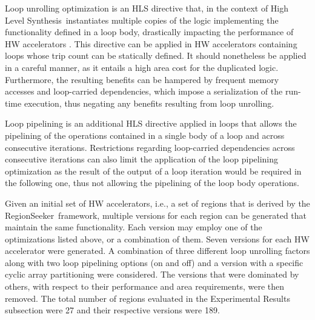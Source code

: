 \documentclass[]{usiinfthesis}
\newcommand{\rseeker}{{RegionSeeker}}
\newcommand{\HLS}{{High Level Synthesis}}
\begin{document}
Loop unrolling optimization is an HLS directive that, in the context of \HLS\, instantiates multiple 
copies of the logic implementing the functionality defined in a loop body, drastically impacting the 
performance of HW accelerators \cite{KulkarniOct12} \cite{KurraApr07}. This directive can be applied in HW
accelerators containing loops whose trip count can be statically defined. It should nonetheless
be applied in a careful manner, as it entails a high area cost for the duplicated logic. Furthermore,
the resulting benefits can be hampered by frequent memory accesses and loop-carried dependencies, which 
impose a serialization of the run-time execution, thus negating any benefits resulting from loop unrolling.\par

Loop pipelining is an additional HLS directive applied in loops that allows the pipelining of 
the operations contained in a single body of a loop and across consecutive iterations. Restrictions 
regarding loop-carried dependencies across consecutive iterations can also limit the application of the loop
pipelining optimization as the result of the output of a loop iteration would be required in the following
one, thus not allowing the pipelining of the loop body operations.\par

Given an initial set of HW accelerators, i.e., a set of regions that is derived by the \rseeker\ framework, 
multiple versions for each region can be generated that maintain the same functionality.
Each version may employ one of the optimizations listed above, or a combination of them. 
Seven versions for each HW accelerator were generated. A combination of three different loop unrolling
factors along with two loop pipelining options (on and off) and a version with a specific cyclic array 
partitioning were considered. The versions that were dominated by others, with 
respect to their performance and area requirements, were then removed. The total number of regions evaluated 
in the Experimental Results subsection were 27 and their respective versions were 189.
\par
\end{document}
